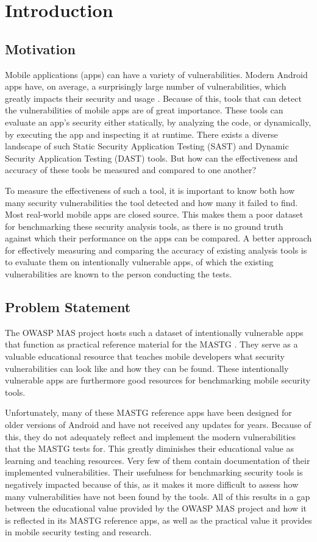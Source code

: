 \chapter{Introduction}
\label{c:introduction}

\section{Motivation}
Mobile applications (apps) can have a variety of vulnerabilities. Modern Android apps have, on average, a surprisingly large number of vulnerabilities, which greatly impacts their security and usage \cite{paper_01}. Because of this, tools that can detect the vulnerabilities of mobile apps are of great importance. These tools can evaluate an app's security either statically, by analyzing the code, or dynamically, by executing the app and inspecting it at runtime. There exists a diverse landscape of such Static Security Application Testing (SAST) and Dynamic Security Application Testing (DAST) tools. But how can the effectiveness and accuracy of these tools be measured and compared to one another? 

To measure the effectiveness of such a tool, it is important to know both how many security vulnerabilities the tool detected and how many it failed to find. Most real-world mobile apps are closed source. This makes them a poor dataset for benchmarking these security analysis tools, as there is no ground truth against which their performance on the apps can be compared. A better approach for effectively measuring and comparing the accuracy of existing analysis tools is to evaluate them on intentionally vulnerable apps, of which the existing vulnerabilities are known to the person conducting the tests. 

\section{Problem Statement}
The OWASP MAS project hosts such a dataset of intentionally vulnerable apps that function as practical reference material for the MASTG \cite{owasp_reference_app_website}. They serve as a valuable educational resource that teaches mobile developers what security vulnerabilities can look like and how they can be found. These intentionally vulnerable apps are furthermore good resources for benchmarking mobile security tools. 

Unfortunately, many of these MASTG reference apps have been designed for older versions of Android and have not received any updates for years. Because of this, they do not adequately reflect and implement the modern vulnerabilities that the MASTG tests for. This greatly diminishes their educational value as learning and teaching resources. Very few of them contain documentation of their implemented vulnerabilities. Their usefulness for benchmarking security tools is negatively impacted because of this, as it makes it more difficult to assess how many vulnerabilities have not been found by the tools. All of this results in a gap between the educational value provided by the OWASP MAS project and how it is reflected in its MASTG reference apps, as well as the practical value it provides in mobile security testing and research. 

